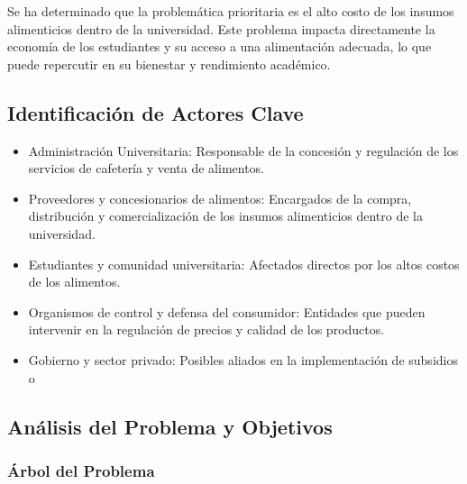 \documentclass[letterpaper, 11pt]{report}
\begin{document}
Se ha determinado que la problemática prioritaria es el alto costo de los
insumos alimenticios dentro de la universidad. Este problema impacta
directamente la economía de los estudiantes y su acceso a una alimentación
adecuada, lo que puede repercutir en su bienestar y rendimiento académico.

\subsection{Identificación de Actores Clave}

\begin{itemize}
      \item  Administración Universitaria: Responsable de la concesión y regulación de los
            servicios de cafetería y venta de alimentos.
      \item  Proveedores y concesionarios de alimentos: Encargados de la compra,
            distribución y comercialización de los insumos alimenticios dentro de la
            universidad.
      \item  Estudiantes y comunidad universitaria: Afectados directos por los altos costos
            de los alimentos.
      \item  Organismos de control y defensa del consumidor: Entidades que pueden intervenir
            en la regulación de precios y calidad de los productos.
      \item  Gobierno y sector privado: Posibles aliados en la implementación de subsidios o
\end{itemize}

\subsection{Análisis del Problema y Objetivos}

\subsubsection{Árbol del Problema}
\end{document}
